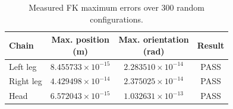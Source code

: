 \begin{table}[H]
\centering
\small
\setlength{\tabcolsep}{10pt}
\caption{Measured FK maximum errors over 300 random configurations.}
\label{tab:fk}
\medskip
\begin{tabular}{lccc}
\toprule
Chain & \shortstack{Max. position\\(m)} & \shortstack{Max. orientation\\(rad)} & Result \\
\midrule
Left leg & $8.455733\times 10^{-15}$ & $2.283510\times 10^{-14}$ & PASS \\
Right leg & $4.429498\times 10^{-14}$ & $2.375025\times 10^{-14}$ & PASS \\
Head & $6.572043\times 10^{-15}$ & $1.032631\times 10^{-13}$ & PASS \\
\bottomrule
\end{tabular}
\end{table}
